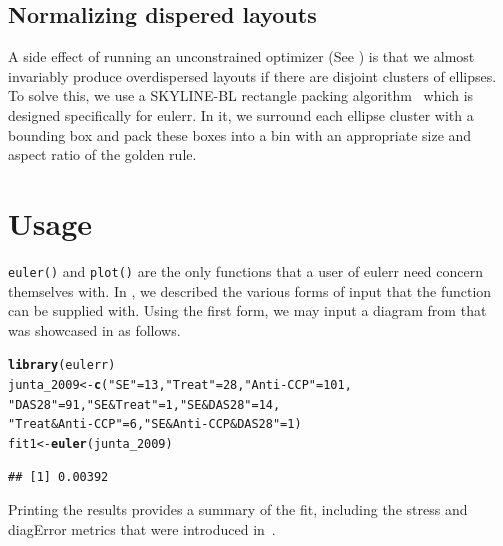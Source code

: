\documentclass[
  oneside,
  openany,
  numbers=noendperiod,
  parskip=half,
  bibliography=totoc
]{scrbook}\usepackage[]{graphicx}\usepackage{xcolor}
\makeatletter
\newcommand{\hlnum}[1]{\textcolor[rgb]{0.686,0.059,0.569}{#1}}%
\newcommand{\hlstr}[1]{\textcolor[rgb]{0.192,0.494,0.8}{#1}}%
\newcommand{\hlstd}[1]{\textcolor[rgb]{0.345,0.345,0.345}{#1}}%
\newcommand{\hlkwb}[1]{\textcolor[rgb]{0.69,0.353,0.396}{#1}}%
\newcommand{\hlkwd}[1]{\textcolor[rgb]{0.737,0.353,0.396}{\textbf{#1}}}%
\newenvironment{kframe}{%
 \def\at@end@of@kframe{}%
 \ifinner\ifhmode%
  \def\at@end@of@kframe{\end{minipage}}%
  \begin{minipage}{\columnwidth}%
 \fi\fi%
 \def\FrameCommand##1{\hskip\@totalleftmargin \hskip-\fboxsep
 \colorbox{shadecolor}{##1}\hskip-\fboxsep
     \hskip-\linewidth \hskip-\@totalleftmargin \hskip\columnwidth}%
 \MakeFramed {\advance\hsize-\width
   \@totalleftmargin\z@ \linewidth\hsize
   \@setminipage}}%
 {\par\unskip\endMakeFramed%
 \at@end@of@kframe}
\newenvironment{knitrout}{}{} %
\newcommand{\pkg}[1]{{\fontseries{b}\selectfont #1}}
\newcommand{\code}[1]{\texttt{#1}}
\makeatother
\begin{document}
\section{Normalizing dispered layouts}
\label{sec:layout}

A side effect of running an unconstrained optimizer (See ) is that we almost invariably produce overdispersed layouts if there are disjoint clusters of ellipses. To solve this, we use a SKYLINE-BL rectangle packing algorithm~\citep{jylanki_2010} which is designed specifically for \pkg{eulerr}. In it, we surround each ellipse cluster with a bounding box and pack these boxes into a bin with an appropriate size and aspect ratio of the golden rule.

\chapter{Usage}\label{ch:usage}

\code{euler()} and \code{plot()} are the only functions that a user of
\pkg{eulerr} need concern themselves with. In , we described
the various forms of input that the function can be supplied with. Using the
first form, we may input a diagram from \citet{junta_2009} that was showcased in
\citet{wilkinson_2012} as follows.

\begin{knitrout}\small
{}\color{fgcolor}\begin{kframe}
\begin{alltt}
\hlkwd{library}\hlstd{(eulerr)}
\hlstd{junta_2009} \hlkwb{<-} \hlkwd{c}\hlstd{(}\hlstr{"SE"} \hlstd{=} \hlnum{13}\hlstd{,} \hlstr{"Treat"} \hlstd{=} \hlnum{28}\hlstd{,} \hlstr{"Anti-CCP"} \hlstd{=} \hlnum{101}\hlstd{,}
                \hlstr{"DAS28"} \hlstd{=} \hlnum{91}\hlstd{,} \hlstr{"SE&Treat"} \hlstd{=} \hlnum{1}\hlstd{,} \hlstr{"SE&DAS28"} \hlstd{=} \hlnum{14}\hlstd{,}
                \hlstr{"Treat&Anti-CCP"} \hlstd{=} \hlnum{6}\hlstd{,} \hlstr{"SE&Anti-CCP&DAS28"} \hlstd{=} \hlnum{1}\hlstd{)}
\hlstd{fit1} \hlkwb{<-} \hlkwd{euler}\hlstd{(junta_2009)}
\end{alltt}
\begin{verbatim}
## [1] 0.00392
\end{verbatim}
\end{kframe}
\end{knitrout}

Printing the results provides a summary of the fit, including the stress and
diagError metrics that were introduced in~.
\end{document}
